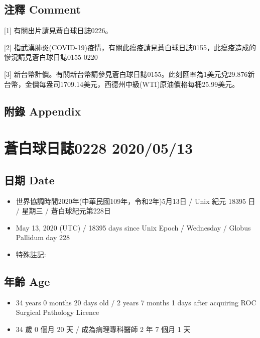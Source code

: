 \documentclass[a5paper, 12pt
]{book}
\providecommand{\tightlist}{%
  \setlength{\itemsep}{0pt}\setlength{\parskip}{0pt}}
\begin{document}
\hypertarget{ux6ce8ux91cb-comment-72}{%
\subsection{注釋 Comment}\label{ux6ce8ux91cb-comment-72}}

{[}1{]} 有關出片請見蒼白球日誌0226。

{[}2{]}
指武漢肺炎(COVID-19)疫情，有關此瘟疫請見蒼白球日誌0155，此瘟疫造成的慘況請見蒼白球日誌0155-0220

{[}3{]}
新台幣計價。有關新台幣請參見蒼白球日誌0155。此刻匯率為1美元兌29.876新台幣，金價每盎司1709.14美元，西德州中級(WTI)原油價格每桶25.99美元。

\hypertarget{ux9644ux9304-appendix-72}{%
\subsection{附錄 Appendix}\label{ux9644ux9304-appendix-72}}

\hypertarget{ux84bcux767dux7403ux65e5ux8a8c0228-20200513}{%
\section{蒼白球日誌0228
2020/05/13}\label{ux84bcux767dux7403ux65e5ux8a8c0228-20200513}}

\hypertarget{ux65e5ux671f-date-73}{%
\subsection{日期 Date}\label{ux65e5ux671f-date-73}}

\begin{itemize}
\tightlist
\item
  世界協調時間2020年(中華民國109年，令和2年)5月13日 / Unix 紀元 18395 日
  / 星期三 / 蒼白球紀元第228日
\item
  May 13, 2020 (UTC) / 18395 days since Unix Epoch / Wednesday / Globus
  Pallidum day 228
\item
  特殊註記:
\end{itemize}

\hypertarget{ux5e74ux9f61-age-73}{%
\subsection{年齡 Age}\label{ux5e74ux9f61-age-73}}

\begin{itemize}
\tightlist
\item
  34 years 0 months 20 days old / 2 years 7 months 1 days after
  acquiring ROC Surgical Pathology Licence
\item
  34 歲 0 個月 20 天 / 成為病理專科醫師 2 年 7 個月 1 天
\end{itemize}
\end{document}
